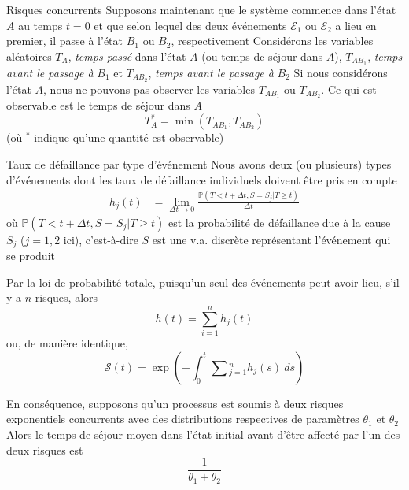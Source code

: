 \documentclass[aspectratio=169]{beamer}\usepackage[]{graphicx}\usepackage[]{xcolor}
\begin{document}

\begin{frame}{Risques concurrents}
Supposons maintenant que le système commence dans l'état $A$ au temps $t=0$ et que selon lequel des deux événements $\mathcal{E}_1$ ou $\mathcal{E}_2$ a lieu en premier, il passe à l'état $B_1$ ou $B_2$, respectivement
\vfill
Considérons les variables aléatoires $T_A$, \emph{temps passé} dans l'état $A$ (ou temps de séjour dans $A$), $T_{AB_1}$, \emph{temps avant le passage à} $B_1$ et $T_{AB_2}$, \emph{temps avant le passage à} $B_2$
\vfill
Si nous considérons l'état $A$, nous ne pouvons pas observer les variables $T_{AB_1}$ ou $T_{AB_2}$. Ce qui est observable est le temps de séjour dans $A$
\[
T^*_A=\min\left( T_{AB_1},T_{AB_2} \right)
\]
(où $^*$ indique qu'une quantité est observable)
\end{frame}

\begin{frame}{Taux de défaillance par type d'événement}
Nous avons deux (ou plusieurs) types d'événements dont les taux de défaillance individuels doivent être pris en compte
\begin{align*}
h_j(t) &= \lim_{\Delta t\to 0} \frac{\mathbb{P}( T<t+\Delta t, S=S_j | T\geq t)}{\Delta t} 
\end{align*}
où $\mathbb{P}(T<t+\Delta t, S=S_j | T\geq t)$ est la probabilité de défaillance due à la cause $S_j$ ($j=1,2$ ici), c'est-à-dire $S$ est une v.a. discrète représentant l'événement qui se produit
\end{frame}

\begin{frame}
Par la loi de probabilité totale, puisqu'un seul des événements peut avoir lieu, s'il y a $n$ risques, alors
$$
h(t) = \sum_{i=1}^n h_j(t)
$$
ou, de manière identique,
$$
\mathcal{S}(t)
=
\exp\left(
  -\int_0^t \sum\textstyle_{j=1}^n h_j(s)\ ds
\right)
$$
\end{frame}

\begin{frame}
En conséquence, supposons qu'un processus est soumis à deux risques exponentiels concurrents avec des distributions respectives de paramètres $\theta_1$ et $\theta_2$
\vfill
Alors le temps de séjour moyen dans l'état initial avant d'être affecté par l'un des deux risques est
$$
\frac{1}{\theta_1+\theta_2}
$$
\end{frame}


\end{document}
